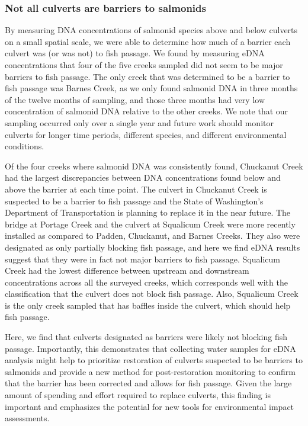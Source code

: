 \documentclass[
]{article}
\begin{document}
\hypertarget{not-all-culverts-are-barriers-to-salmonids}{%
\subsubsection{Not all culverts are barriers to
salmonids}\label{not-all-culverts-are-barriers-to-salmonids}}

By measuring DNA concentrations of salmonid species above and below
culverts on a small spatial scale, we were able to determine how much of
a barrier each culvert was (or was not) to fish passage. We found by
measuring eDNA concentrations that four of the five creeks sampled did
not seem to be major barriers to fish passage. The only creek that was
determined to be a barrier to fish passage was Barnes Creek, as we only
found salmonid DNA in three months of the twelve months of sampling, and
those three months had very low concentration of salmonid DNA relative
to the other creeks. We note that our sampling occurred only over a
single year and future work should monitor culverts for longer time
periods, different species, and different environmental conditions.

Of the four creeks where salmonid DNA was consistently found, Chuckanut
Creek had the largest discrepancies between DNA concentrations found
below and above the barrier at each time point. The culvert in Chuckanut
Creek is suspected to be a barrier to fish passage and the State of
Washington's Department of Transportation is planning to replace it in
the near future. The bridge at Portage Creek and the culvert at
Squalicum Creek were more recently installed as compared to Padden,
Chuckanut, and Barnes Creeks. They also were designated as only
partially blocking fish passage, and here we find eDNA results suggest
that they were in fact not major barriers to fish passage. Squalicum
Creek had the lowest difference between upstream and downstream
concentrations across all the surveyed creeks, which corresponds well
with the classification that the culvert does not block fish passage.
Also, Squalicum Creek is the only creek sampled that has baffles inside
the culvert, which should help fish passage.

Here, we find that culverts designated as barriers were likely not
blocking fish passage. Importantly, this demonstrates that collecting
water samples for eDNA analysis might help to prioritize restoration of
culverts suspected to be barriers to salmonids and provide a new method
for post-restoration monitoring to confirm that the barrier has been
corrected and allows for fish passage. Given the large amount of
spending and effort required to replace culverts, this finding is
important and emphasizes the potential for new tools for environmental
impact assessments.
\end{document}
